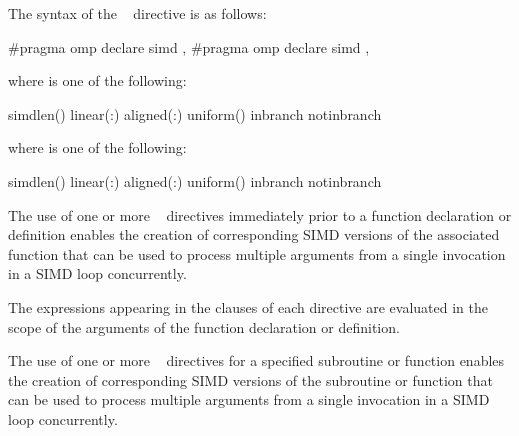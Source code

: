 \syntax
The syntax of the ~ directive is as follows:

\begin{ccppspecific}
\begin{ompcPragma}
#pragma omp declare simd \plc{[clause[ [},\plc{] clause] ... ] new-line}
\plc{[}#pragma omp declare simd \plc{[clause[ [},\plc{] clause] ... ] new-line]}
\plc{[ ... ]}
\end{ompcPragma}

where  is one of the following:

\begin{indentedcodelist}
simdlen()
linear(\plc{linear-list[ }:\plc{ linear-step]})
aligned(\plc{argument-list[ }:\plc{ alignment]})
uniform()
inbranch
notinbranch
\end{indentedcodelist}
\end{ccppspecific}


\begin{fortranspecific}

where  is one of the following:
\begin{indentedcodelist}
simdlen()
linear(\plc{linear-list[ }:\plc{ linear-step]})
aligned(\plc{argument-list[ }:\plc{ alignment]})
uniform()
inbranch
notinbranch
\end{indentedcodelist}
\end{fortranspecific}


\descr
\begin{ccppspecific}
The use of one or more ~ directives immediately prior
to a function declaration or definition enables the
creation of corresponding SIMD
versions of the associated function that can be used to process multiple arguments from
a single invocation in a SIMD loop concurrently.

The expressions appearing in the clauses of each directive are evaluated in the scope of
the arguments of the function declaration or definition.
\end{ccppspecific}

\begin{samepage}
\begin{fortranspecific}
The use of one or more ~ directives for a specified
subroutine or function enables the creation of corresponding SIMD versions of the
subroutine or function that can be used to process multiple arguments from a
single invocation in a SIMD loop concurrently.
\end{fortranspecific}
\end{samepage}

